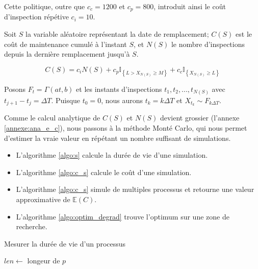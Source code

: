 \documentclass[10pt,a4paper]{article}
\begin{document}
Cette politique, outre que $c_c=1200$ et $c_p=800$, introduit ainsi le coût d'inspection répétive $c_i = 10$.

Soit $S$ la variable aléatoire représentant la date de remplacement; $C(S)$ est le coût de maintenance cumulé à l’instant $S$, et $N(S)$ le nombre d'inspections depuis la dernière remplacement jusqu'à $S$.

\begin{equation}
    \label{c_s_de}
    C\left( S \right) = {c_i}N\left( S \right) + {c_p}{\mathbb{I}_{\left\{ {L > {X_{N\left( S \right)}} \geq M} \right\}}} + {c_c}{\mathbb{I}_{\left\{ {{X_{N\left( S \right)}} \geq L} \right\}}}
\end{equation}

Posons ${F_t} = \Gamma \left( {at,b} \right)$ et les instants d'inspections ${t_1},{t_2},...,{t_{N\left( S \right)}}$ avec ${t_{j + 1}} - {t_j} = \Delta T$. Puisque $t_0 = 0$, nous aurons ${t_k} = k\Delta T$ et $X_{t_k} \sim F_{k\Delta T}$.

Comme le calcul analytique de $C(S)$ et $N(S)$ devient grossier (l'annexe \eqref{annexe:ana_e_c}), nous passons à la méthode Monté Carlo, qui nous permet d'estimer la vraie valeur en répétant un nombre suffisant de simulations.
\begin{itemize}
    \item L'algorithme \eqref{algo:s} calcule la durée de vie d'une simulation.
    \item L'algorithme \eqref{algo:c_s} calcule le coût d'une simulation.
    \item L'algorithme \eqref{algo:c_s} simule de multiples processus et retourne une valeur approximative de $\mathbb{E}(C)$.
    \item L'algorithme \eqref{algo:optim_degrad} trouve l'optimum sur une zone de recherche.
\end{itemize}

\begin{algorithm}[!h]
    \caption{Mesurer la durée de vie d'un processus}
    \label{algo:s}
    $len \leftarrow $ longeur de $p$\;
\end{algorithm}
\end{document}
